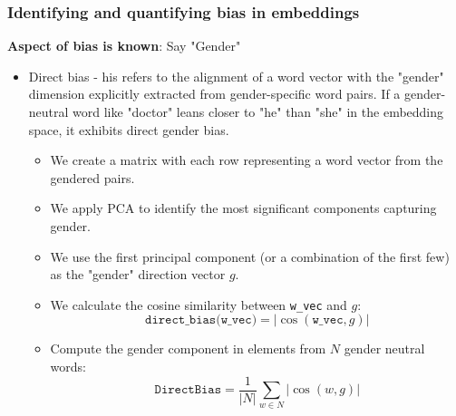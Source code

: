 \documentclass[12pt]{article}
\begin{document}
        \subsubsection{Identifying and quantifying bias in embeddings}
            \textbf{Aspect of bias is known}: Say "Gender"
            \begin{itemize}
                \item Direct bias - his refers to the alignment of a word vector with the "gender" dimension explicitly extracted from gender-specific word pairs. If a gender-neutral word like "doctor" leans closer to "he" than "she" in the embedding space, it exhibits direct gender bias.
                \newpage
                \begin{mdframed}
                    \begin{itemize}
                        \item We create a matrix with each row representing a word vector from the gendered pairs.
                        \item We apply PCA to identify the most significant components capturing gender.
                        \item We use the first principal component (or a combination of the first few) as the "gender" direction vector $g$.
                        \item We calculate the cosine similarity between \texttt{w\_vec} and $g$:
                        \[ \texttt{direct\_bias(w\_vec)} = \left| \cos(\texttt{w\_vec}, g) \right| \]
                        \item Compute the gender component in elements from $N$ gender neutral words:
                        \[ \texttt{DirectBias} = \frac{1}{|N|} \sum_{w \in N} \left| \cos(w, g) \right| \]
                    \end{itemize}
                \end{mdframed}


\end{itemize}
\end{document}
